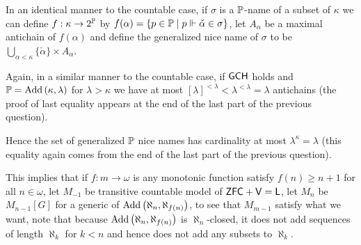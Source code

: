 \begin{cExercise}
	In an identical manner to the countable case, if $\sigma$ is a $\P$-name of a subset of $\kappa$ we can define $f:\kappa\to 2^{\P}$ by $f(\alpha)=\{p\in \P\mid p\force \check{\alpha}\in\sigma\}$, let $A_\alpha$ be a maximal antichain of $f(\alpha)$ and define the generalized nice name of $\sigma$ to be $\bigcup_{\alpha<\kappa}\{\check{\alpha}\}\times A_\alpha$.
	
	Again, in a similar manner to the countable case, if $\sf GCH$ holds and $\P=\Add{\kappa}{\lambda}$ for $\lambda>\kappa$ we have at most $[\lambda]^{<\lambda}<\lambda^{<\lambda}=\lambda$ antichains (the proof of last equality appears at the end of the last part of the previous question).
	
	Hence the set of generalized $\P$ nice names has cardinality at most $\lambda^\kappa=\lambda$ (this equality again comes from the end of the last part of the previous question).
	
	This implies that if $f:m\to\omega$ is any monotonic function satisfy $f(n)\ge n+1$ for all $n\in\omega$, let $M_{-1}$ be transitive countable model of $\sf ZFC+V=L$, let $M_n$ be $M_{n-1}[G]$ for a generic of $\Add{\aleph_{n}}{\aleph_{f(n)}}$, to see that $M_{m-1}$ satisfy what we want, note that because $\Add{\aleph_{n}}{\aleph_{f(n)}}$ is $\aleph_{n}$-closed, it does not add sequences of length $\aleph_k$ for $k<n$ and hence does not add any subsets to $\aleph_k$.
\end{cExercise}
